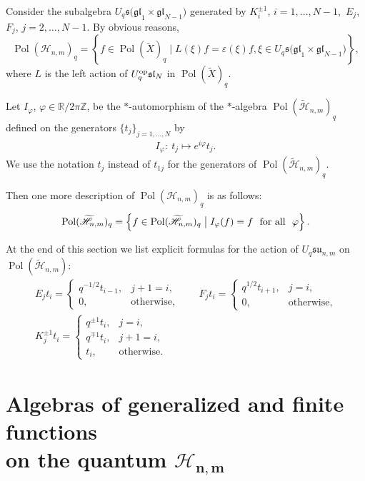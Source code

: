 \documentclass[11pt]{article}
\begin{document}
Consider the subalgebra $U_q \mathfrak{s(gl}_1 \times \mathfrak{gl}_{N-1})$ generated by $K_i^{\pm 1}$,
$i=1,\dots,N-1,$ $E_j$, $F_j$, $j =2,\dots,N-1.$ By obvious reasons,
\[
\operatorname{Pol}(\mathscr{H}_{n,m})_q=\left\{f \in \operatorname{Pol}(\widetilde{X})_q \;\big|\;
L(\xi)f=\varepsilon(\xi)f, \xi \in U_q \mathfrak{s(gl}_1 \times \mathfrak{gl}_{N-1})\right\},
\]
where $L$ is the left action of $U_q^{\rm op} \mathfrak{sl}_N$ in $\operatorname{Pol}(\widetilde{X})_q$.

Let $I_\varphi$, $\varphi\in\mathbb{R}/2\pi\mathbb{Z}$, be the $*$-automorphism of the $*$-algebra
$\operatorname{Pol}(\widetilde{\mathscr{H}}_{n,m})_q$ def\/ined on the generators $\{t_j\}_{j=1,\ldots,N}$ by
\begin{gather}\label{I_phi}
I_\varphi: \ t_j\mapsto e^{i\varphi}t_j.
\end{gather}
We
use the notation $t_j$ instead of $t_{1j}$ for the generators of
$\operatorname{Pol}(\widetilde{\mathscr{H}}_{n,m})_q$.

Then one more description of $\operatorname{Pol}(\mathscr{H}_{n,m})_q$ is as follows:
\[
\operatorname{Pol}(\widetilde{\mathscr{H}}_{n,m})_q = \left\{ f\in
\operatorname{Pol}(\widetilde{\mathscr{H}}_{n,m})_q\; \big| \;I_\varphi(f)=f\text{ \ for all \
}\varphi\right\}.
\]

At the end of this section we list explicit formulas for the action of $U_{q}\mathfrak{su}_{n,m}$ on
$\operatorname{Pol}(\widetilde{\mathscr{H}}_{n,m})$:
\begin{gather*}
E_jt_i =
\begin{cases}
q^{-1/2}t_{i-1}, & j+1=i,
\\ 0, & \text{otherwise},
\end{cases}\qquad
F_jt_i =
\begin{cases}
q^{1/2}t_{i+1}, & j=i,
\\ 0, & \text{otherwise},
\end{cases}
\\ K_j^{\pm 1}t_i  =
\begin{cases}
q^{\pm 1}t_i, & j=i,
\\ q^{\mp 1}t_i, & j+1=i,
\\ t_i, & \text{otherwise}.
\end{cases}
\end{gather*}



\section[Algebras of generalized and finite functions on the quantum $\mathscr{H}_{n,m}$]{Algebras of generalized and f\/inite functions\\ on the quantum $\boldsymbol{\mathscr{H}_{n,m}}$}\label{finite}
\end{document}
